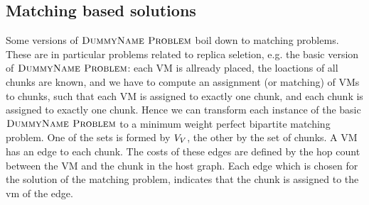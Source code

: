 \subsection{Matching based solutions} 

Some versions of $\textsc{DummyName Problem}$ boil down to matching problems. These are in 
particular problems related to replica seletion, e.g. the basic version of 
$\textsc{DummyName Problem}$: each VM 
is allready placed, the loactions of all chunks are known, and we have to 
compute an assignment (or matching) of VMs to chunks, such that each VM is 
assigned to 
exactly one chunk, and each chunk is assigned to exactly one chunk. Hence we 
can transform each instance of the basic $\textsc{DummyName Problem}$ to a minimum weight 
perfect bipartite 
matching problem\cite{schrijver_combinatorial_optimization}. One of the sets 
is formed by $V_V$, the other by the 
set of chunks. A VM has an edge to each chunk. The costs of these edges are 
defined by the hop count between the VM and the chunk in the host graph. Each 
edge which is chosen for the solution of the matching problem, indicates that 
the chunk is assigned to the vm of the edge.

